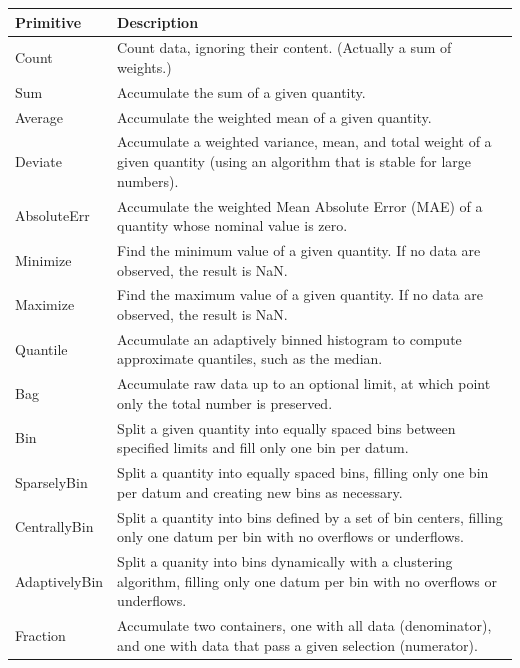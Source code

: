 \documentclass{beamer}
\begin{document}
\begin{frame}
\vspace{0.3 cm}
\hspace{-0.5 cm}\begin{minipage}{\linewidth}
\tiny
\renewcommand{\arraystretch}{1.3}
\begin{tabular}{p{0.1\linewidth} p{0.9\linewidth}}
Primitive       & Description \\\hline
Count           & Count data, ignoring their content. (Actually a sum of weights.) \\
Sum             & Accumulate the sum of a given quantity. \\
Average         & Accumulate the weighted mean of a given quantity. \\
Deviate         & Accumulate a weighted variance, mean, and total weight of a given quantity (using an algorithm that is stable for large numbers). \\
AbsoluteErr     & Accumulate the weighted Mean Absolute Error (MAE) of a quantity whose nominal value is zero. \\
Minimize        & Find the minimum value of a given quantity. If no data are observed, the result is NaN. \\
Maximize        & Find the maximum value of a given quantity. If no data are observed, the result is NaN. \\
Quantile        & Accumulate an adaptively binned histogram to compute approximate quantiles, such as the median. \\
Bag             & Accumulate raw data up to an optional limit, at which point only the total number is preserved. \\
Bin             & Split a given quantity into equally spaced bins between specified limits and fill only one bin per datum. \\
SparselyBin     & Split a quantity into equally spaced bins, filling only one bin per datum and creating new bins as necessary. \\
CentrallyBin    & Split a quantity into bins defined by a set of bin centers, filling only one datum per bin with no overflows or underflows. \\
AdaptivelyBin   & Split a quanity into bins dynamically with a clustering algorithm, filling only one datum per bin with no overflows or underflows. \\
Fraction        & Accumulate two containers, one with all data (denominator), and one with data that pass a given selection (numerator). \\

\end{tabular}
\end{minipage}
\end{frame}
\end{document}
